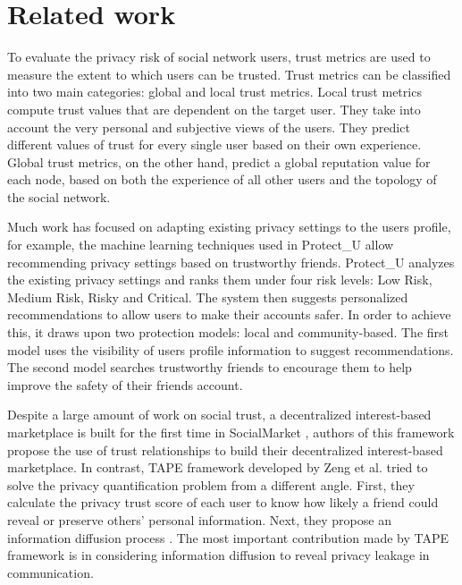 \section{Related work} \label{sec:Related work}

To evaluate the privacy risk of social network users,
	trust metrics are used to measure the extent to which users can be trusted.
Trust metrics can be classified into two main categories:
	global and local trust metrics.
Local trust metrics compute trust values that are dependent on the target user.
They take into account the very personal and subjective views of the users.
They predict different values of trust for every single user based on their own experience.
Global trust metrics,
	on the other hand,
	predict a global reputation value for each node,
	based on both the experience of all other users and the topology of the social network.

Much work has focused on adapting existing privacy settings to the users profile,
	for example,
	the machine learning techniques used in Protect\_U \cite{gandouz_protect_2012} allow recommending privacy settings based on trustworthy friends.
Protect\_U analyzes the existing privacy settings and ranks them under four risk levels:
	Low Risk,
	Medium Risk,
	Risky and Critical.
The system then suggests personalized recommendations to allow users to make their accounts safer.
In order to achieve this,
	it draws upon two protection models:
	local and community-based.
The first model uses the visibility of users profile information to suggest recommendations.
The second model searches trustworthy friends to encourage them to help improve the safety of their friends account.

Despite a large amount of work on social trust,
	a decentralized interest-based marketplace is built for the first time in SocialMarket \cite{frey_social_2011},
	authors of this framework propose the use of trust relationships to build their decentralized interest-based marketplace.
In contrast,
	TAPE framework developed by Zeng et al. \cite{yongbozeng_study_2015} tried to solve the privacy quantification problem \cite{gundecha_exploiting_2011} from a different angle.
First,
	they calculate the privacy trust score of each user to know how likely a friend could reveal or preserve others’ personal information.
Next,
	they propose an information diffusion process \cite{fang_privacy_2010}.
The most important contribution made by TAPE framework \cite{yongbozeng_study_2015} is in considering information diffusion to reveal privacy leakage in communication.

